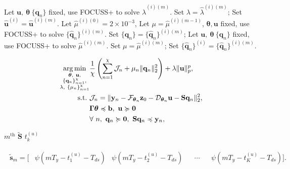 \documentclass[]{article}
\DeclareMathOperator*{\argmin}{arg\,min}
\begin{document}
\begin{algorithm}[!tb]
\begin{algorithmic}[1]
        \STATE Let $\mathbf{u},~\boldsymbol{\theta}~\{\mathbf{q}_{n}\}$ fixed, use FOCUSS+ to solve $\hat{\lambda}^{(i)(m)}$. Set $\lambda = \hat{\lambda}^{(i)(m)}$;
      \ENDFOR
      \STATE Set $\hat{\mathbf{u}}^{(i)} = \hat{\mathbf{u}}^{(i)(m)}$.
      \STATE Let $\hat{\mu}^{(i)(0)} = 2 \times 10^{-3}$,
        \STATE Let $\mu = \hat{\mu}^{(i)(m-1)}$, $\boldsymbol{\theta},\mathbf{u}$ fixed, use FOCUSS+ to solve $\{\hat{\mathbf{q}}_{n}\}^{(i)(m)}$. Set $\{\mathbf{q}_{n}\} = \{\hat{\mathbf{q}}_{n}\}^{(i)(m)}$;
        \STATE Let $\mathbf{u},~\boldsymbol{\theta}~\{\mathbf{q}_{n}\}$ fixed, use FOCUSS+ to solve $\hat{\mu}^{(i)(m)}$. Set $\mu = \hat{\mu}^{(i)(m)}$;
      \ENDFOR
      \STATE Set $\{\hat{\mathbf{q}}_{n}\}^{(i)} =  \{\hat{\mathbf{q}}_{n}\}^{(i)(m)}$.
    \ENDFOR
  \end{algorithmic}
\end{algorithm}

\begin{subequations} \label{fml:the:optimization2}
  \renewcommand{\theequation}
  {\theparentequation-\arabic{equation}}
  \begin{align}
  \argmin\limits_{\substack{\boldsymbol{\theta},~\mathbf{u}, \\ \{\mathbf{q}_n\}_{n=1}^{\chi}, \\ \lambda,~\{\mu_n\}_{n=1}^{\chi}}} & \frac{1}{\chi} \left( \sum_{n=1}^{\chi} \mathcal{J}_n + \mu_n \lVert \mathbf{q}_n \rVert_2^2 \right) + \lambda \lVert \mathbf{u} \rVert^p_p, \\
  \mathrm{s.t.}~&\mathcal{J}_n = \lVert \mathbf{y}_n - \mathcal{F}_{\boldsymbol{\theta}_n} \mathbf{z}_{0} - \mathcal{D}_{\boldsymbol{\theta}_n} \mathbf{u} - \mathbf{S} \mathbf{q}_n \rVert^2_2, \label{fml:loss-channel2}\\
  & \boldsymbol{\Gamma} \boldsymbol{\theta} \preccurlyeq \mathbf{b},~ \mathbf{u} \succcurlyeq \mathbf{0} \label{fml:cons-phasic2}\\
  & \forall~n,~\mathbf{q}_n \succcurlyeq \mathbf{0},~\mathbf{S}\mathbf{q}_n \preccurlyeq \mathbf{y}_n, \label{fml:cons-tonic2}
  \end{align}
\end{subequations}

$m^{\mathrm{th}}$ \qquad $\tilde{\mathbf{S}}$ \qquad $t^{(u)}_k$

\begin{align} \label{fml:tonic-basis-1}
\begin{aligned}
\tilde{\mathbf{s}}_m = \big[ &\psi(mT_y - t^{(u)}_1 - T_{ds}) & \psi(mT_y - t^{(u)}_2 - T_{ds}) && \cdots && \psi(mT_y - t^{(u)}_K - T_{ds}) \big].
\end{aligned}
\end{align}
\end{document}
